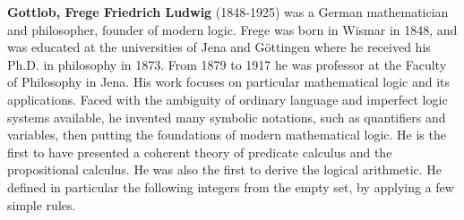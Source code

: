 \textbf{Gottlob, Frege Friedrich Ludwig} (1848-1925) was a German mathematician and philosopher, founder of modern logic. Frege was born in Wismar in 1848, and was educated at the universities of Jena and Göttingen where he received his Ph.D. in philosophy in 1873. From 1879 to 1917 he was professor at the Faculty of Philosophy in Jena. His work focuses on particular mathematical logic and its applications. Faced with the ambiguity of ordinary language and imperfect logic systems available, he invented many symbolic notations, such as quantifiers and variables, then putting the foundations of modern mathematical logic. He is the first to have presented a coherent theory of predicate calculus and the propositional calculus. He was also the first to derive the logical arithmetic. He defined in particular the following integers from the empty set, by applying a few simple rules.

